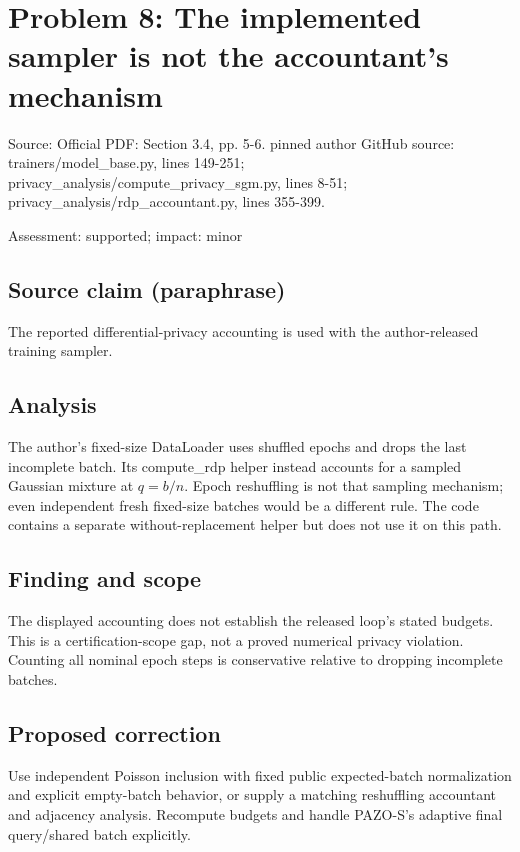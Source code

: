 \documentclass[11pt]{article}
\begin{document}
\section*{Problem 8: The implemented sampler is not the accountant's mechanism}

Source: Official PDF: Section 3.4, pp. 5-6. pinned author GitHub source: trainers/model\_base.py, lines 149-251; privacy\_analysis/compute\_privacy\_sgm.py, lines 8-51; privacy\_analysis/rdp\_accountant.py, lines 355-399.

Assessment: supported; impact: minor

\subsection*{Source claim (paraphrase)}

The reported differential-privacy accounting is used with the author-released training sampler.

\subsection*{Analysis}

The author's fixed-size DataLoader uses shuffled epochs and drops the last incomplete batch. Its compute\_rdp helper instead accounts for a sampled Gaussian mixture at \(q=b/n\). Epoch reshuffling is not that sampling mechanism; even independent fresh fixed-size batches would be a different rule. The code contains a separate without-replacement helper but does not use it on this path.

\subsection*{Finding and scope}

The displayed accounting does not establish the released loop's stated budgets. This is a certification-scope gap, not a proved numerical privacy violation. Counting all nominal epoch steps is conservative relative to dropping incomplete batches.

\subsection*{Proposed correction}

Use independent Poisson inclusion with fixed public expected-batch normalization and explicit empty-batch behavior, or supply a matching reshuffling accountant and adjacency analysis. Recompute budgets and handle PAZO-S's adaptive final query/shared batch explicitly.
\end{document}
